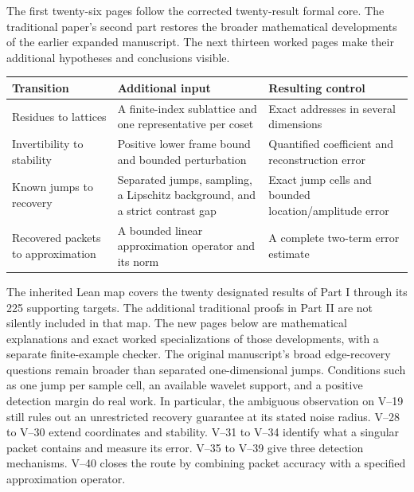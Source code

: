 The first twenty-six pages follow the corrected twenty-result formal core. The traditional paper's second part restores the broader mathematical developments of the earlier expanded manuscript. The next thirteen worked pages make their additional hypotheses and conclusions visible.
\begin{tabularx}{\linewidth}{@{}p{.21\linewidth}YY@{}}\toprule
Transition & Additional input & Resulting control\\\midrule
Residues to lattices & A finite-index sublattice and one representative per coset & Exact addresses in several dimensions\\
Invertibility to stability & Positive lower frame bound and bounded perturbation & Quantified coefficient and reconstruction error\\
Known jumps to recovery & Separated jumps, sampling, a Lipschitz background, and a strict contrast gap & Exact jump cells and bounded location/amplitude error\\
Recovered packets to approximation & A bounded linear approximation operator and its norm & A complete two-term error estimate\\\bottomrule
\end{tabularx}
The inherited Lean map covers the twenty designated results of Part I through its 225 supporting targets. The additional traditional proofs in Part II are not silently included in that map. The new pages below are mathematical explanations and exact worked specializations of those developments, with a separate finite-example checker.
The original manuscript's broad edge-recovery questions remain broader than separated one-dimensional jumps. Conditions such as one jump per sample cell, an available wavelet support, and a positive detection margin do real work. In particular, the ambiguous observation on V--19 still rules out an unrestricted recovery guarantee at its stated noise radius.
V--28 to V--30 extend coordinates and stability. V--31 to V--34 identify what a singular packet contains and measure its error. V--35 to V--39 give three detection mechanisms. V--40 closes the route by combining packet accuracy with a specified approximation operator.

